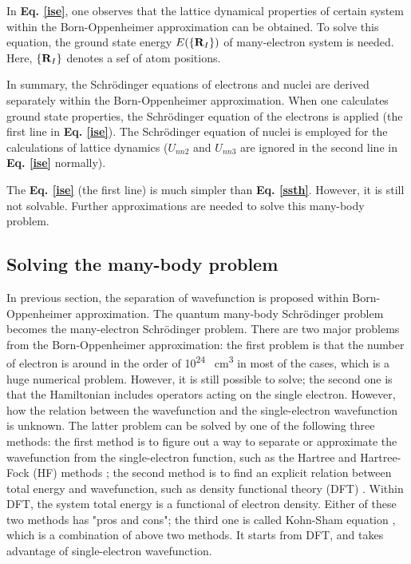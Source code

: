 \documentclass[a4paper, 12pt, titlepage,oneside,drop]{kthesis}
\begin{document}
In \textbf{Eq. \ref{ise}}, one observes that the lattice dynamical properties of certain system within the Born-Oppenheimer approximation can be obtained. To solve this equation,
the ground state energy $E(\{{{\textbf R}_{I}}\})$ of many-electron system is needed. Here, $\{{\textbf R}_{I}\}$ denotes a sef of atom positions.
 
In summary, the Schrödinger equations of electrons and nuclei are derived separately within the Born-Oppenheimer approximation. When one calculates ground state properties,
the Schrödinger equation of the electrons is applied (the first line in \textbf{Eq. \ref{ise}}). The Schrödinger equation of nuclei is employed for the calculations of lattice dynamics 
($U_{nn2}$ and $U_{nn3}$ are ignored \cite{clasdft} in the second line in \textbf{Eq. \ref{ise}} normally).

The \textbf{Eq. \ref{ise}} (the first line) is much simpler than \textbf{Eq. \ref{ssth}}. However, it is still not solvable. Further approximations  are needed
to solve this many-body problem.

\subsection{Solving the many-body problem}

In previous section, the separation of wavefunction is proposed within Born-Oppenheimer approximation. The quantum many-body Schrödinger problem becomes the many-electron 
Schrödinger problem. There are two major problems from the Born-Oppenheimer approximation: the first problem is that the number of electron is around in the order of 10\textsuperscript{24} \si{\per\cubic\centi\metre} in most
of the cases, which is a huge numerical problem. However, it is still possible to solve; the second one is that the Hamiltonian includes operators acting on the single electron. However, how the relation between the wavefunction and
the single-electron wavefunction is unknown. The latter problem can be solved by one of the following three methods: the first method is to figure out a way to separate or approximate the wavefunction from the single-electron function,
such as the Hartree and Hartree-Fock (HF) methods \cite{hartreeapproximation,hartreefockapproximation}; the second method is to find an explicit relation between total energy and wavefunction, such as density functional theory (DFT)
\cite{hohenberg1964inhomogeneous}. Within DFT, the system total energy is a functional of electron density. Either of these two methods has "pros and cons"; the third one is called Kohn-Sham
equation \cite{kohn1965self}, which is a combination of above two methods. It starts from DFT, and takes advantage of single-electron wavefunction.
\end{document}
